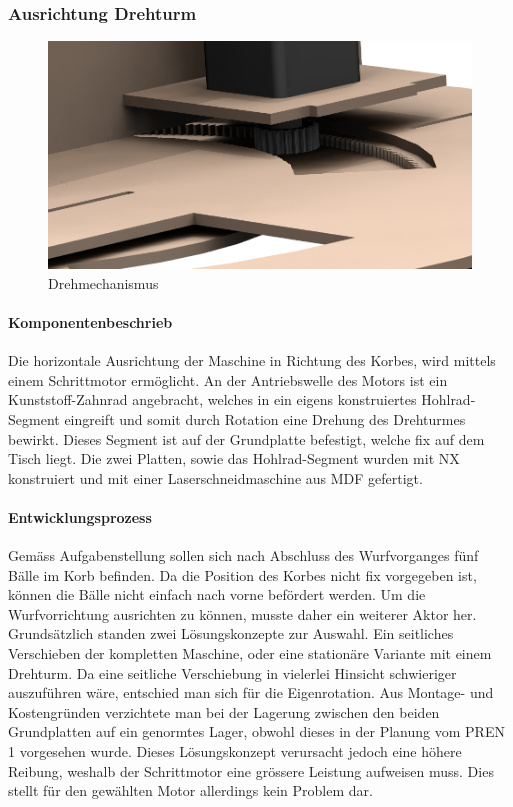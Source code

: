 \subsubsection{Ausrichtung Drehturm}
\begin{figure}[h!]
	\centering
	\includegraphics[width=\linewidth]{../../fig/Drehmechanismus}
	\caption{Drehmechanismus}
	\label{fig:Drehmechanismus}
\end{figure}
\paragraph{Komponentenbeschrieb\\}
Die horizontale Ausrichtung der Maschine in Richtung des Korbes, wird mittels einem Schrittmotor ermöglicht. An der Antriebswelle des Motors ist ein Kunststoff-Zahnrad angebracht, welches in ein eigens konstruiertes Hohlrad-Segment eingreift und somit durch Rotation eine Drehung des Drehturmes bewirkt. Dieses Segment ist auf der Grundplatte befestigt, welche fix auf dem Tisch liegt. Die zwei Platten, sowie das Hohlrad-Segment wurden mit NX konstruiert und mit einer Laserschneidmaschine aus MDF gefertigt.

\paragraph{Entwicklungsprozess\\}
Gemäss Aufgabenstellung sollen sich nach Abschluss des Wurfvorganges fünf Bälle im Korb befinden. Da die Position des Korbes nicht fix vorgegeben ist, können die Bälle nicht einfach nach vorne befördert werden. Um die Wurfvorrichtung ausrichten zu können, musste daher ein weiterer Aktor her. Grundsätzlich standen zwei Lösungskonzepte zur Auswahl. Ein seitliches Verschieben der kompletten Maschine, oder eine stationäre Variante mit einem Drehturm. Da eine seitliche Verschiebung in vielerlei Hinsicht schwieriger auszuführen wäre, entschied man sich für die Eigenrotation. Aus Montage- und Kostengründen verzichtete man bei der Lagerung zwischen den beiden Grundplatten auf ein genormtes Lager, obwohl dieses in der Planung vom PREN 1 vorgesehen wurde. Dieses Lösungskonzept verursacht jedoch eine höhere Reibung, weshalb der Schrittmotor eine grössere Leistung aufweisen muss. Dies stellt für den gewählten Motor allerdings kein Problem dar.